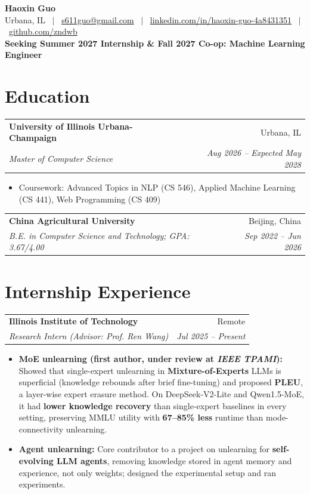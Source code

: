 \documentclass[10pt, letterpaper]{article}
\makeatletter
\newcommand{\entry}[4]{%
    \noindent
    \begin{tabularx}{\textwidth}{@{}>{\raggedright\arraybackslash}X r@{}}
        \textbf{#1} & #2 \\
        \textit{#3} & \textit{#4}
    \end{tabularx}\par\vspace{-1pt}%
}
\makeatother
\begin{document}
\begin{center}
    {\LARGE \textbf{Haoxin Guo}} \\[3pt]
    Urbana, IL \ $|$ \
    \href{mailto:s611guo@gmail.com}{s611guo@gmail.com} \ $|$ \
    \href{https://www.linkedin.com/in/haoxin-guo-4a8431351}{linkedin.com/in/haoxin-guo-4a8431351} \ $|$ \
    \href{https://github.com/zndwb}{github.com/zndwb} \\[2pt]
    \textbf{Seeking Summer 2027 Internship \& Fall 2027 Co-op: Machine Learning Engineer}
\end{center}

\section{Education}

\entry{University of Illinois Urbana-Champaign}{Urbana, IL}
      {Master of Computer Science}{Aug 2026 -- Expected May 2028}
\begin{itemize}
    \item Coursework: Advanced Topics in NLP (CS 546), Applied Machine Learning (CS 441), Web Programming (CS 409)
\end{itemize}

\entry{China Agricultural University}{Beijing, China}
      {B.E. in Computer Science and Technology; GPA: 3.67/4.00}{Sep 2022 -- Jun 2026}
\vspace{3pt}

\section{Internship Experience}

\entry{Illinois Institute of Technology}{Remote}
      {Research Intern (Advisor: Prof. Ren Wang)}{Jul 2025 -- Present}
\begin{itemize}
    \item \textbf{MoE unlearning (first author, under review at \textit{IEEE TPAMI}):} Showed that single-expert unlearning
          in \textbf{Mixture-of-Experts} LLMs is superficial (knowledge rebounds after brief fine-tuning)
          and proposed \textbf{PLEU}, a layer-wise expert erasure method. On DeepSeek-V2-Lite and
          Qwen1.5-MoE, it had \textbf{lower knowledge recovery} than single-expert baselines in every setting,
          preserving MMLU utility with \textbf{67--85\% less} runtime than mode-connectivity unlearning.
    \item \textbf{Agent unlearning:} Core contributor to a project on unlearning for \textbf{self-evolving LLM agents},
          removing knowledge stored in agent memory and experience, not only weights; designed the experimental setup
          and ran experiments.
\end{itemize}
\end{document}
